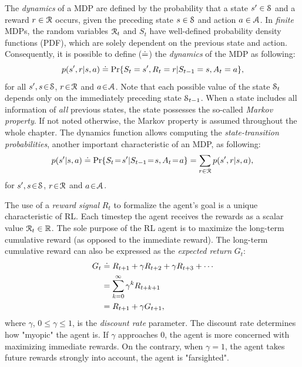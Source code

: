 \documentclass[a4paper, 12pt]{article}
\begin{document}
The \emph{dynamics} of a MDP are defined by the probability that a state \(s'\in \S\)
and a reward \(r\in\R\) occurs, given the preceding state \(s\in\S\) and action
\(a\in\A\). In \emph{finite} MDPs, the random variables \(\R_t\) and \(S_t\) have
well-defined probability density functions (PDF), which are solely dependent on
the previous state and action. Consequently, it is possible to define (\(\defeq\))
the \emph{dynamics} of the MDP as following:
\begin{equation}
    p(s',r|s,a) \defeq \Pr{S_t=s',R_t=r|S_{t-1}=s,A_t=a},
\end{equation}
for all \(s',s\!\in\!\S\), \(r\!\in\!\R\) and \(a\!\in\!\A\). Note that each possible
value of the state \(\S_t\) depends only on the immediately preceding state
\(\S_{t-1}\). When a state includes all information of \emph{all} previous states, the
state possesses the so-called \emph{Markov property}. If not noted otherwise, the
Markov property is assumed throughout the whole chapter. The dynamics function
allows computing the \emph{state-transition probabilities}, another important
characteristic of an MDP, as following:
\begin{equation}
    p(s'|s,a) \defeq \Pr{S_t\!=\!s'|S_{t-1}\!=\!s,A_t\!=\!a} = \sum_{r\in\R}{p(s', r|s, a)},
\end{equation}
for \(s',s\!\in\!\S\), \(r\!\in\!\R\) and \(a\!\in\!\A\).

The use of a \emph{reward signal} \(R_t\) to formalize the agent's goal is a unique
characteristic of RL. Each timestep the agent receives the rewards as a scalar
value \(\R_t\in\Re\). The sole purpose of the RL agent is to maximize the
long-term cumulative reward (as opposed to the immediate reward). The long-term
cumulative reward can also be expressed as the \emph{expected return} \(G_t\):
\begin{equation} \label{eq-expected-return}
\begin{split}
    G_t &\defeq R_{t+1} + \gamma R_{t+2} + \gamma R_{t+3} + \cdots \\
    &= \sum_{k=0}^{\infty}{\gamma^k R_{t+k+1}} \\
    &= R_{t+1} + \gamma G_{t+1},
\end{split}
\end{equation}
where \(\gamma\), \(0\leq\gamma\leq 1\), is the \emph{discount rate} parameter. The
discount rate determines how "myopic" the agent is. If \(\gamma\) approaches 0,
the agent is more concerned with maximizing immediate rewards. On the contrary,
when \(\gamma\!=\! 1\), the agent takes future rewards strongly into account, the
agent is "farsighted".
\end{document}
